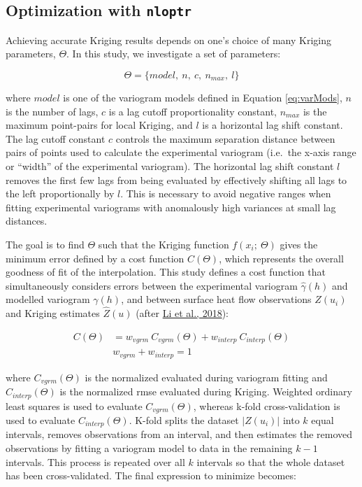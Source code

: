 \hypertarget{nloptr}{%
\subsection{\texorpdfstring{Optimization with \texttt{nloptr}}{Optimization with nloptr}}\label{nloptr}}

Achieving accurate Kriging results depends on one's choice of many Kriging parameters, \(\Theta\). In this study, we investigate a set of parameters:

\begin{equation} 
  \Theta = \{model,\ n,\ c,\ n_{max},\ l\}
  \label{eq:params}
\end{equation}

where \(model\) is one of the variogram models defined in Equation \eqref{eq:varMods}, \(n\) is the number of lags, \(c\) is a lag cutoff proportionality constant, \(n_{max}\) is the maximum point-pairs for local Kriging, and \(l\) is a horizontal lag shift constant. The lag cutoff constant \(c\) controls the maximum separation distance between pairs of points used to calculate the experimental variogram (i.e.~the x-axis range or ``width'' of the experimental variogram). The horizontal lag shift constant \(l\) removes the first few lags from being evaluated by effectively shifting all lags to the left proportionally by \(l\). This is necessary to avoid negative ranges when fitting experimental variograms with anomalously high variances at small lag distances.

The goal is to find \(\Theta\) such that the Kriging function \(f(x_i;\ \Theta)\) gives the minimum error defined by a cost function \(C(\Theta)\), which represents the overall goodness of fit of the interpolation. This study defines a cost function that simultaneously considers errors between the experimental variogram \(\hat{\gamma}(h)\) and modelled variogram \(\gamma(h)\), and between surface heat flow observations \(Z(u_i)\) and Kriging estimates \(\hat{Z}(u)\) (after \protect\hyperlink{ref-li2018}{Li et al., 2018}):

\begin{equation}
  \begin{aligned}
    C(\Theta) &= w_{vgrm}\ C_{vgrm}(\Theta) + w_{interp}\ C_{interp}(\Theta) \\
    &w_{vgrm} + w_{interp} = 1
  \end{aligned}
  \label{eq:cost}
\end{equation}

where \(C_{vgrm}(\Theta)\) is the normalized  evaluated during variogram fitting and \(C_{interp}(\Theta)\) is the normalized \gls{rmse} evaluated during Kriging. Weighted ordinary least squares is used to evaluate \(C_{vgrm}(\Theta)\), whereas k-fold cross-validation is used to evaluate \(C_{interp}(\Theta)\). K-fold splits the dataset \(|Z(u_i)|\) into \(k\) equal intervals, removes observations from an interval, and then estimates the removed observations by fitting a variogram model to data in the remaining \(k-1\) intervals. This process is repeated over all \(k\) intervals so that the whole dataset has been cross-validated. The final expression to minimize becomes:

